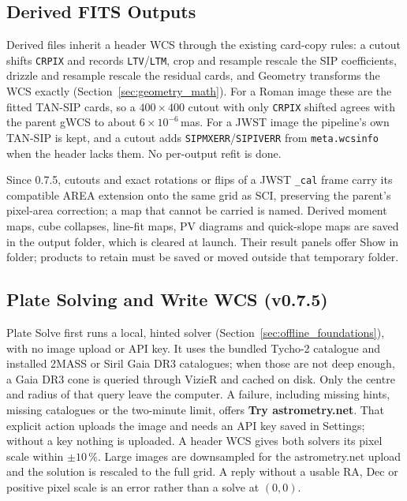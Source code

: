 \documentclass[11pt,a4paper]{article}
\newcommand{\code}[1]{\texttt{\small #1}}
\begin{document}
    \subsection{Derived FITS Outputs}

    Derived files inherit a header WCS through the existing card-copy rules: a cutout shifts \code{CRPIX} and records \code{LTV}/\code{LTM}, crop and resample rescale the SIP coefficients, drizzle and resample rescale the residual cards, and Geometry transforms the WCS exactly (Section~\ref{sec:geometry_math}). For a Roman image these are the fitted TAN-SIP cards, so a $400 \times 400$ cutout with only \code{CRPIX} shifted agrees with the parent gWCS to about $6 \times 10^{-6}$\,mas. For a JWST image the pipeline's own TAN-SIP is kept, and a cutout adds \code{SIPMXERR}/\code{SIPIVERR} from \code{meta.wcsinfo} when the header lacks them. No per-output refit is done.

    Since 0.7.5, cutouts and exact rotations or flips of a JWST \code{\_cal} frame carry its compatible AREA extension onto the same grid as SCI, preserving the parent's pixel-area correction; a map that cannot be carried is named. Derived moment maps, cube collapses, line-fit maps, PV diagrams and quick-slope maps are saved in the output folder, which is cleared at launch. Their result panels offer Show in folder; products to retain must be saved or moved outside that temporary folder.

    \subsection{Plate Solving and Write WCS (v0.7.5)}
    \label{sec:platesolve}

    Plate Solve first runs a local, hinted solver (Section~\ref{sec:offline_foundations}), with no image upload or API key. It uses the bundled Tycho-2 catalogue and installed 2MASS or Siril Gaia DR3 catalogues; when those are not deep enough, a Gaia DR3 cone is queried through VizieR and cached on disk. Only the centre and radius of that query leave the computer. A failure, including missing hints, missing catalogues or the two-minute limit, offers \textbf{Try astrometry.net}. That explicit action uploads the image and needs an API key saved in Settings; without a key nothing is uploaded. A header WCS gives both solvers its pixel scale within $\pm 10\,\%$. Large images are downsampled for the astrometry.net upload and the solution is rescaled to the full grid. A reply without a usable RA, Dec or positive pixel scale is an error rather than a solve at $(0, 0)$.
\end{document}
